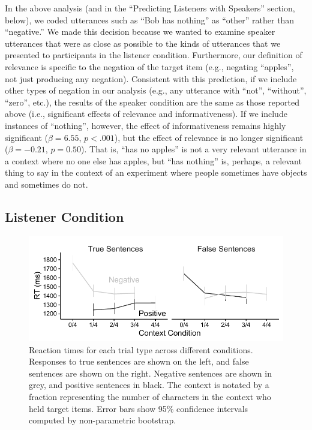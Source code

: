 \documentclass[man, noapacite]{apa2}
\begin{document}
In the above analysis (and in the ``Predicting Listeners with Speakers'' section, below), we coded utterances such as ``Bob has nothing'' as ``other'' rather than ``negative.'' We made this decision because we wanted to examine speaker utterances that were as close as possible to the kinds of utterances that we presented to participants in the listener condition. Furthermore, our definition of relevance is specific to the negation of the target item (e.g., negating ``apples'', not just producing any negation). Consistent with this prediction, if we include other types of negation in our analysis (e.g., any utterance with ``not'', ``without'', ``zero'', etc.), the results of the speaker condition are the same as those reported above (i.e., significant effects of relevance and informativeness). If we include instances of ``nothing'', however, the effect of informativeness remains highly significant ($\beta= 6.55$, $p< .001$), but the effect of relevance is no longer significant ($\beta= -0.21$, $p = 0.50$). That is, ``has no apples'' is not a very relevant utterance in a context where no one else has apples, but ``has nothing'' is, perhaps, a relevant thing to say in the context of an experiment where people sometimes have objects and sometimes do not.

\subsection{Listener Condition}

\begin{figure}[t]
\begin{center}
\includegraphics[width=6in]{figures/rts_mod.pdf}
\caption{\label{fig:listenerrt} Reaction times for each trial type across different conditions. Responses to true sentences are shown on the left, and false sentences are shown on the right.  Negative sentences are shown in grey, and positive sentences in black.  The context is notated by a fraction representing the number of characters in the context who held target items. Error bars show 95\% confidence intervals computed by non-parametric bootstrap.}
\end{center}
\end{figure}
\end{document}

